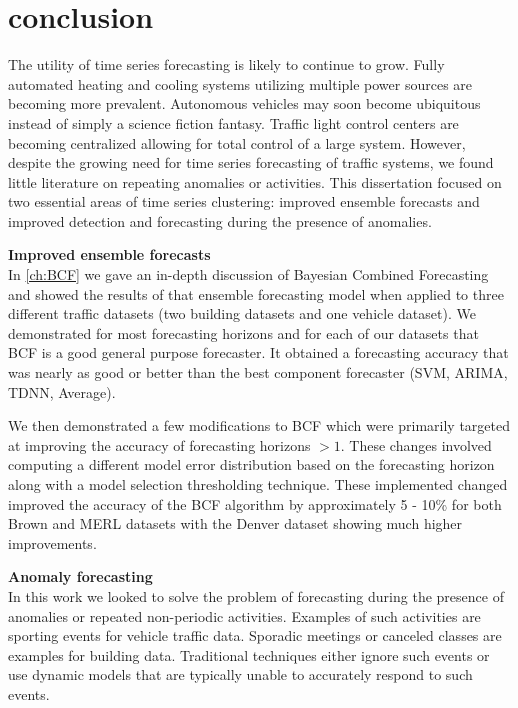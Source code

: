 \chapter{conclusion}

The utility of time series forecasting is likely to continue to grow.  Fully automated heating and cooling systems utilizing multiple power sources are becoming more prevalent.  Autonomous vehicles may soon become ubiquitous instead of simply a science fiction fantasy.  Traffic light control centers are becoming centralized allowing for total control of a large system.  However, despite the growing need for time series forecasting of traffic systems, we found little literature on repeating anomalies or activities.  This dissertation focused on two essential areas of time series clustering: improved ensemble forecasts and improved detection and forecasting during the presence of anomalies.  

\bigskip
\noindent \textbf{Improved ensemble forecasts}\\
In \ref{ch:BCF} we gave an in-depth discussion of Bayesian Combined Forecasting and showed the results of that ensemble forecasting model when applied to three different traffic datasets (two building datasets and one vehicle dataset).  We demonstrated for most forecasting horizons and for each of our datasets that BCF is a good general purpose forecaster.  It obtained a forecasting accuracy that was nearly as good or better than the best component forecaster (SVM, ARIMA, TDNN, Average).  

We then demonstrated a few modifications to BCF which were primarily targeted at improving the accuracy of forecasting horizons $ > 1$.  These changes involved computing a different model error distribution based on the forecasting horizon along with a model selection thresholding technique.  These implemented changed improved the accuracy of the BCF algorithm by approximately 5 - 10\% for both Brown and MERL datasets with the Denver dataset showing much higher improvements.  

 \bigskip
\noindent \textbf{Anomaly forecasting}\\
In this work we looked to solve the problem of forecasting during the presence of anomalies or repeated non-periodic activities.  Examples of such activities are sporting events for vehicle traffic data.  Sporadic meetings or canceled classes are examples for building data.  Traditional techniques either ignore such events or use dynamic models that are typically unable to accurately respond to such events.  

